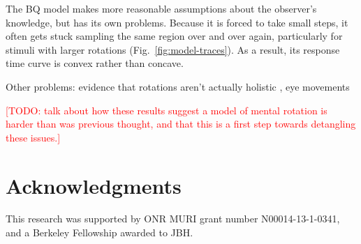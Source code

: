 \documentclass[10pt,letterpaper]{article}
\newcommand{\TODO}[1]{\textcolor{red}{[TODO: #1]}}
\newcommand{\Bq}[0]{BQ}
\begin{document}
The \Bq{} model makes more reasonable assumptions about the observer's
knowledge, but has its own problems. Because it is forced to take
small steps, it often gets stuck sampling the same region over and
over again, particularly for stimuli with larger rotations
(Fig.~\ref{fig:model-traces}). As a result, its response time curve is
convex rather than concave.

Other problems: evidence that rotations aren't actually holistic
\cite{Yuille:1982tx}, eye movements \cite{Just1976}

\TODO{talk about how these results suggest a model of mental rotation
  is harder than was previous thought, and that this is a first step
  towards detangling these issues.}

\section{Acknowledgments}

This research was supported by ONR MURI grant number N00014-13-1-0341,
and a Berkeley Fellowship awarded to JBH.



\setlength{\bibleftmargin}{.125in}
\setlength{\bibindent}{-\bibleftmargin}


\end{document}
